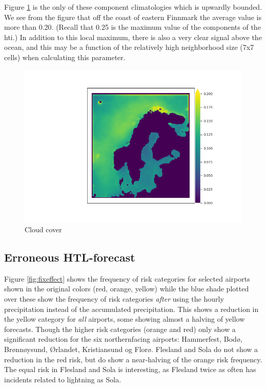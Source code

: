 Figure \ref{fig:cloudcovermeps} is the only of these component climatologies which is upwardly bounded. We see from the figure that off the coast of eastern Finnmark the average value is more than 0.20. (Recall that 0.25 is the maximum value of the components of the \acrshort{hti}.) In addition to this local maximum, there is also a very clear signal above the ocean, and this may be a function of the relatively high neighborhood size (7x7 cells) when calculating this parameter. 

\begin{figure}
    \centering
    \includegraphics[width = \textwidth]{Figures/C.png}
    \caption{Cloud cover}
    \label{fig:cloudcovermeps}
\end{figure}

\subsection{Erroneous HTL-forecast}

Figure \ref{fig:fixeffect} shows the frequency of risk categories for selected airports shown in the original colors (red, orange, yellow) while the blue shade plotted over these show the frequency of risk categories \textit{after} using the hourly precipitation instead of the accumulated precipitation. This shows a reduction in the yellow category for \textit{all} airports, some showing almost a halving of yellow forecasts. Though the higher risk categories (orange and red) only show a significant reduction for the six northernfacing airports: Hammerfest, Bodø, Brønnøysund, Ørlandet, Kristiansund og Florø. Flesland and Sola do not show a reduction in the red risk, but do show a near-halving of the orange risk frequency. The equal risk in Flesland and Sola is interesting, as Flesland twice as often has incidents related to lightning as Sola.

